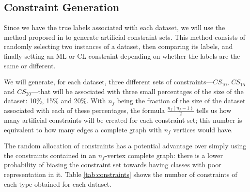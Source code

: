 \documentclass[review]{elsarticle}
\begin{document}
\clearpage

\subsection{Constraint Generation} \label{sec:ConstGent}

Since we have the true labels associated with each dataset, we will use the method proposed in \cite{wagstaff2001constrained} to generate artificial constraint sets. This method consists of randomly selecting two instances of a dataset, then comparing its labels, and finally setting an ML or CL constraint depending on whether the labels are the same or different.

We will generate, for each dataset, three different sets of constraints---$CS_{10}$, $CS_{15}$ and $CS_{20}$---that will be associated with three small percentages of the size of the dataset: 10\%, 15\% and 20\%. With $n_f$ being the fraction of the size of the dataset associated with each of these percentages, the formula $\frac{n_f(n_f-1)}{2}$ tells us how many artificial constraints will be created for each constraint set; this number is equivalent to how many edges a complete graph with $n_f$ vertices would have.

The random allocation of constraints has a potential advantage over simply using the constraints contained in an $n_f$-vertex complete graph: there is a lower probability of biasing the constraint set towards having classes with poor representation in it. Table \ref{tab:constraints} shows the number of constraints of each type obtained for each dataset.
\end{document}

